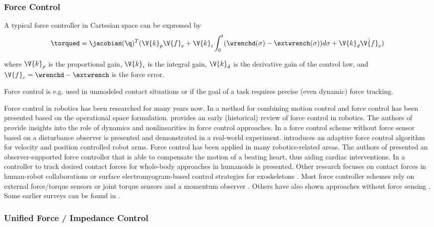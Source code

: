 \subsubsection{Force Control}

A typical force controller in Cartesian space can be expressed by
\begin{equation}
\torqued=\jacobian(\q)^T(\V{k}_p \V{f}_e + \V{k}_i \int_0^t (\wrenchd(\sigma)-\extwrench(\sigma))d\sigma + \V{k}_d \dot{\V{f}}_e )
\end{equation}

where $\V{k}_p$ is the proportional gain, $\V{k}_i$ is the integral gain, $\V{k}_d$ is the derivative gain of the control law, and $\V{f}_e=\wrenchd-\extwrench$ is the force error.

Force control is e.g. used in unmodeled contact situations or if the goal of a task requires precise (even dynamic) force tracking.

Force control in robotics has been researched for many years now.
In \cite{Khatib.1986} a method for combining motion control and force control has been presented based on the operational space formulation.
\cite{Whitney.1987} provides an early (historical) review of force control in robotics.
The authors of \cite{Eppinger.1986,Eppinger.1987} provide insights into the role of dynamics and nonlinearities in force control approaches.
In \cite{Eom.1998} a force control scheme without force sensor based on a disturbance observer is presented and demonstrated in a real-world experiment.
\cite{Roy.2002} introduces an adaptive force control algorithm for velocity and position controlled robot arms.
Force control has been applied in many robotics-related areas. The authors of \cite{Cortesao.2017} presented an observer-supported force controller that is able to compensate the motion of a beating heart, thus aiding cardiac interventions. In \cite{Stephens.2010} a controller to track desired contact forces for whole-body approaches in humanoids is presented. Other research focuses on contact forces in human-robot collaborations \cite{Magrini.2015} or surface electromyogram-based control strategies for exoskeletons \cite{Li.2014}.
Most force controller schemes rely on external force/torque sensors or joint torque sensors and a momentum observer \cite{Haddadin.2017}. Others have also shown approaches without force sensing \cite{Stolt.2012}.
Some earlier surveys can be found in \cite{Zeng.1997,Siciliano.1999,Yoshikawa.2000}.

\subsubsection{Unified Force / Impedance Control}


